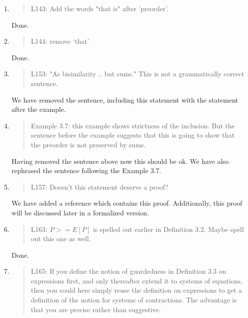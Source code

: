 \begin{enumerate}
\item \begin{quote}
    L143: Add the words "that is" after 'preorder'.
  \end{quote}
  \Mark
  Done.
  
\item \begin{quote}
    L144: remove ‘that’
  \end{quote}
  \Mark
  Done.
  
\item \begin{quote}
    L153: "As bisimilarity .. but sums." This is not a grammatically correct sentence.
  \end{quote}

  \Mark
  We have removed the sentence, including this statement with the
  statement after the example.
  
\item \begin{quote}
    Example 3.7: this example shows strictness of the inclusion. But
    the sentence before the example suggests that this is going to
    show that the preorder is not preserved by sums.
  \end{quote}

  \Mark
  Having removed the sentence above now this should be ok. We have
  also rephrased the sentence following the Example 3.7.
  
\item \begin{quote}
    L157: Doesn’t this statement deserve a proof?
  \end{quote}
  \Mark
  We have added a reference which contains this proof. Additionally,
  this proof will be discussed later in a formalized version.
  
\item \begin{quote}
    L163: $P >= E[P]$ is spelled out earlier in Definition 3.2. Maybe spell out this one as well.
  \end{quote}

  \Mark
  Done.

\item \begin{quote}
    L165: If you define the notion of guardedness in Definition 3.3 on
    expressions first, and only thereafter extend it to systems of
    equations, then you could here simply reuse the definition on
    expressions to get a definition of the notion for systems of
    contractions. The advantage is that you are precise rather than
    suggestive.
  \end{quote}


\end{enumerate}
